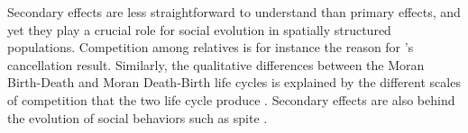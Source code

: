 \documentclass[11pt, letterpaper]{article}
\newcommand{\bb}{\mathsf{b}}
\newcommand{\cc}{\mathsf{c}}
\newcommand{\out}{\textrm{out}}
\newcommand{\Qout}{Q_{\out}}
\begin{document}

Secondary effects are less straightforward to understand than primary effects, and yet they play a crucial role for social evolution in spatially structured populations. Competition among relatives is for instance the reason for \citet{Taylor1992}'s cancellation result. Similarly, the qualitative differences between the Moran Birth-Death and Moran Death-Birth life cycles is explained by the different scales of competition that the two life cycle produce \citep{GrafenArchetti2008, DebarreHD2014}. Secondary effects are also behind the evolution of social behaviors such as spite \citep{WestGardner2010}. 


\end{document}
